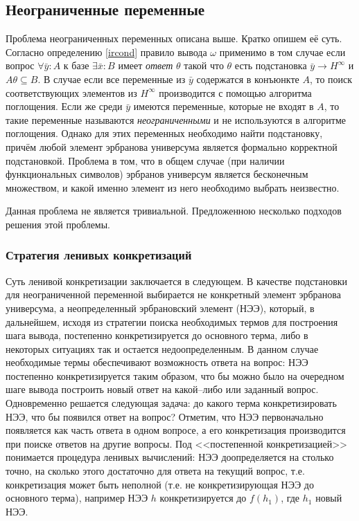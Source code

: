 \subsection{Неограниченные переменные}
\label{s:uhe}
Проблема неограниченных переменных описана выше. Кратко опишем её суть. Согласно определению \ref{ircond} правило вывода $\omega$ применимо в том случае если вопрос $\forall \bar{y}\colon A$ к базе $\exists \bar{x}\colon B$ имеет {\em ответ} $\theta$  такой что $\theta$ есть подстановка $\bar{y} \rightarrow H^{\infty}$ и $A\theta \subseteq B$. В случае если все переменные из $\bar{y}$ содержатся в конъюнкте $A$, то поиск соответствующих элементов из $H^{\infty}$ производится с помощью алгоритма поглощения. Если же среди $\bar{y}$ имеются переменные, которые не входят в $A$, то такие переменные называются \emph{неограниченными} и не используются в алгоритме поглощения. Однако для этих переменных необходимо найти подстановку, причём любой элемент эрбранова универсума является формально корректной подстановкой. Проблема в том, что в общем случае (при наличии функциональных символов) эрбранов универсум является бесконечным множеством, и какой именно элемент из него необходимо выбрать неизвестно.

Данная проблема не является тривиальной. Предложенною несколько подходов решения этой проблемы.

\subsubsection{Стратегия ленивых конкретизаций}
Суть ленивой конкретизации заключается в следующем. В качестве подстановки для неограниченной переменной выбирается не конкретный элемент эрбранова универсума, а неопределенный эрбрановский элемент (НЭЭ), который, в дальнейшем, исходя из стратегии поиска необходимых термов для построения шага вывода, постепенно конкретизируется до основного терма, либо в некоторых ситуациях так и остается недоопределенным. В данном случае необходимые термы обеспечивают возможность ответа на вопрос: НЭЭ постепенно конкретизируется таким образом, что бы можно было на очередном шаге вывода построить новый ответ на какой--либо или заданный вопрос. Одновременно решается следующая задача: до какого терма конкретизировать НЭЭ, что бы появился ответ на вопрос? Отметим, что НЭЭ первоначально появляется как часть ответа в одном вопросе, а его конкретизация производится при поиске ответов на другие вопросы. Под <<постепенной конкретизацией>> понимается процедура ленивых вычислений: НЭЭ доопределяется на столько точно, на сколько этого достаточно для ответа на текущий вопрос, т.е. конкретизация может быть неполной (т.е. не конкретизирующая НЭЭ до основного терма), например НЭЭ $h$ конкретизируется до $f(h_1)$, где $h_1$ новый НЭЭ.

